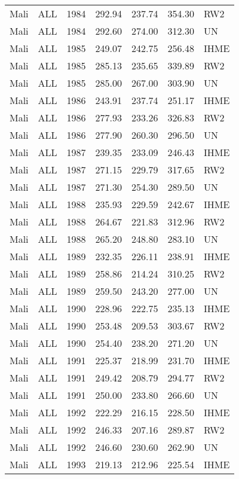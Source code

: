 \begin{longtable}{lllrrrl}
  Mali & ALL & 1984 & 292.94 & 237.74 & 354.30 & RW2 \\ 
  Mali & ALL & 1984 & 292.60 & 274.00 & 312.30 & UN \\ 
  Mali & ALL & 1985 & 249.07 & 242.75 & 256.48 & IHME \\ 
  Mali & ALL & 1985 & 285.13 & 235.65 & 339.89 & RW2 \\ 
  Mali & ALL & 1985 & 285.00 & 267.00 & 303.90 & UN \\ 
  Mali & ALL & 1986 & 243.91 & 237.74 & 251.17 & IHME \\ 
  Mali & ALL & 1986 & 277.93 & 233.26 & 326.83 & RW2 \\ 
  Mali & ALL & 1986 & 277.90 & 260.30 & 296.50 & UN \\ 
  Mali & ALL & 1987 & 239.35 & 233.09 & 246.43 & IHME \\ 
  Mali & ALL & 1987 & 271.15 & 229.79 & 317.65 & RW2 \\ 
  Mali & ALL & 1987 & 271.30 & 254.30 & 289.50 & UN \\ 
  Mali & ALL & 1988 & 235.93 & 229.59 & 242.67 & IHME \\ 
  Mali & ALL & 1988 & 264.67 & 221.83 & 312.96 & RW2 \\ 
  Mali & ALL & 1988 & 265.20 & 248.80 & 283.10 & UN \\ 
  Mali & ALL & 1989 & 232.35 & 226.11 & 238.91 & IHME \\ 
  Mali & ALL & 1989 & 258.86 & 214.24 & 310.25 & RW2 \\ 
  Mali & ALL & 1989 & 259.50 & 243.20 & 277.00 & UN \\ 
  Mali & ALL & 1990 & 228.96 & 222.75 & 235.13 & IHME \\ 
  Mali & ALL & 1990 & 253.48 & 209.53 & 303.67 & RW2 \\ 
  Mali & ALL & 1990 & 254.40 & 238.20 & 271.20 & UN \\ 
  Mali & ALL & 1991 & 225.37 & 218.99 & 231.70 & IHME \\ 
  Mali & ALL & 1991 & 249.42 & 208.79 & 294.77 & RW2 \\ 
  Mali & ALL & 1991 & 250.00 & 233.80 & 266.60 & UN \\ 
  Mali & ALL & 1992 & 222.29 & 216.15 & 228.50 & IHME \\ 
  Mali & ALL & 1992 & 246.33 & 207.16 & 289.87 & RW2 \\ 
  Mali & ALL & 1992 & 246.60 & 230.60 & 262.90 & UN \\ 
  Mali & ALL & 1993 & 219.13 & 212.96 & 225.54 & IHME \\ 

\end{longtable}
